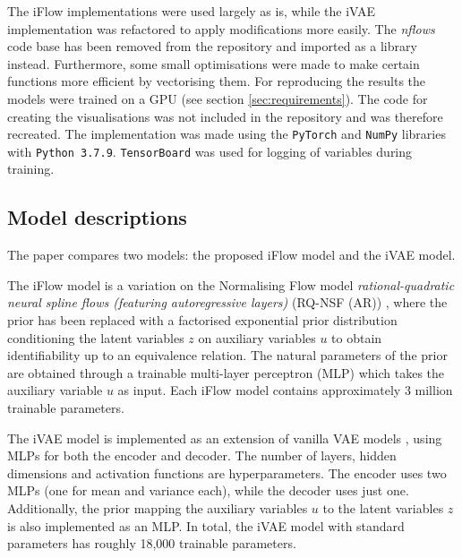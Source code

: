 The iFlow implementations were used largely as is, while the iVAE implementation was refactored to apply modifications more easily. The \textit{nflows} code base has been removed from the repository and imported as a library instead. Furthermore, some small optimisations were made to make certain functions more efficient by vectorising them. For reproducing the results the models were trained on a GPU (see section \ref{sec:requirements}).  The code for creating the visualisations was not included in the repository and was therefore recreated.
The implementation was made using the \texttt{PyTorch} and \texttt{NumPy} libraries with \texttt{Python 3.7.9}. \texttt{TensorBoard} was used for logging of variables during training.

\subsection{Model descriptions}

The paper compares two models: the proposed iFlow model and the iVAE model.

The iFlow model is a variation on the Normalising Flow model \textit{rational-quadratic neural spline flows (featuring autoregressive layers)} (RQ-NSF (AR)) \cite{durkan2019neural}, where the prior has been replaced with a factorised exponential prior distribution conditioning the latent variables $z$ on auxiliary variables $u$ to obtain identifiability up to an equivalence relation. The natural parameters of the prior are obtained through a trainable multi-layer perceptron (MLP) which takes the auxiliary variable $u$ as input. Each iFlow model contains approximately 3 million trainable parameters.

The iVAE model is implemented as an extension of vanilla VAE models \cite{kingma2013auto}, using MLPs for both the encoder and decoder. The number of layers, hidden dimensions and activation functions are hyperparameters. The encoder uses two MLPs (one for mean and variance each), while the decoder uses just one. Additionally, the prior mapping the auxiliary variables $u$ to the latent variables $z$ is also implemented as an MLP. In total, the iVAE model with standard parameters has roughly 18,000 trainable parameters.

